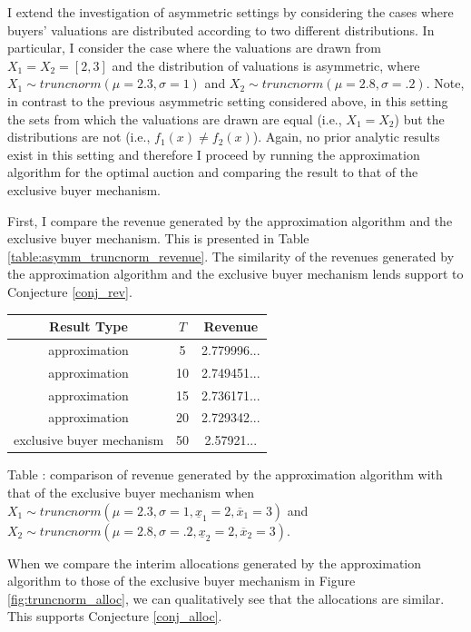 \documentclass{article}
\newcounter{fig}
\begin{document}
I extend the investigation of asymmetric settings by considering the cases where buyers' valuations are distributed according to two different distributions. In particular, I consider the case where the valuations are drawn from $X_1 = X_2 = [2,3]$ and the distribution of valuations is asymmetric, where $X_1 \sim truncnorm(\mu=2.3, \sigma=1)$ and $X_2 \sim truncnorm(\mu=2.8, \sigma=.2)$. Note, in contrast to the previous asymmetric setting considered above, in this setting the sets from which the valuations are drawn are equal (i.e., $X_1 = X_2$) but the distributions are not (i.e., $f_1(x) \neq f_2(x)$). Again, no prior analytic results exist in this setting and therefore I proceed by running the approximation algorithm for the optimal auction and comparing the result to that of the exclusive buyer mechanism.

First, I compare the revenue generated by the approximation algorithm and the exclusive buyer mechanism. This is presented in Table \ref{table:asymm_truncnorm_revenue}. The similarity of the revenues generated by the approximation algorithm and the exclusive buyer mechanism lends support to Conjecture \ref{conj_rev}.

\begin{center}
    \begin{tabular}{ |c|c|c| } 
    \hline
    Result Type & $T$ & Revenue \\
    \hline
    \hline
    approximation & 5 & 2.779996... \\ 
    approximation & 10 & 2.749451... \\ 
    approximation & 15 & 2.736171... \\ 
    approximation & 20 & 2.729342... \\ 
    exclusive buyer mechanism & 50 & 2.57921... \\
    \hline
    \end{tabular}

    \vspace{1mm}
    \raggedright{\small {\sc Table \thefig\label{table:asymm_truncnorm_revenue}:} comparison of revenue generated by the approximation algorithm with that of the exclusive buyer mechanism when $X_1 \sim truncnorm(\mu=2.3, \sigma=1, \underline{x}_1=2, \overline{x}_1=3)$ and $X_2 \sim truncnorm(\mu=2.8, \sigma=.2, \underline{x}_2=2, \overline{x}_2=3)$.}
\end{center}

When we compare the interim allocations generated by the approximation algorithm to those of the exclusive buyer mechanism in Figure \ref{fig:truncnorm_alloc}, we can qualitatively see that the allocations are similar. This supports Conjecture \ref{conj_alloc}.
\end{document}
